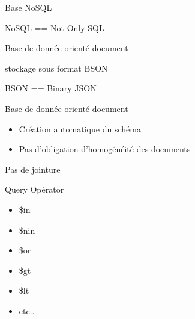 \documentclass{beamer}
\begin{document}
\begin{frame}
  \begin{center}
    \Huge{}
    Base NoSQL
  \end{center}

  \begin{center}
    \normalsize{}
    NoSQL == Not Only SQL
  \end{center}
\end{frame}

\begin{frame}
  \begin{center}
    \Huge{}
    Base de donnée orienté document
  \end{center}

  \begin{center}
    \normalsize{}
    stockage sous format BSON
  \end{center}

  \begin{center}
    \normalsize{}
    BSON == Binary JSON
  \end{center}
\end{frame}

\begin{frame}
  \begin{center}
    \Huge{}
    Base de donnée orienté document
  \end{center}

  \begin{itemize}
    \item Création automatique du schéma
    \item Pas d'obligation d'homogénéité des documents
  \end{itemize}
\end{frame}

\begin{frame}
  \begin{center}
    \Huge{}
    Pas de jointure
  \end{center}
\end{frame}

\begin{frame}
  \begin{center}
    \Huge{}
    Query Opérator
  \end{center}

  \begin{itemize}
    \item \$in
    \item \$nin
    \item \$or
    \item \$gt
    \item \$lt
    \item etc..
  \end{itemize}
\end{frame}
\end{document}
